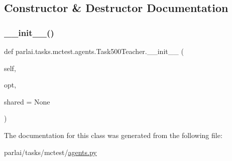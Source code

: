 \subsection{Constructor \& Destructor Documentation}
\mbox{\label{classparlai_1_1tasks_1_1mctest_1_1agents_1_1Task500Teacher_a122ab6b53f9bb97f84ae1a5e29a6deca}} 
\subsubsection{\texorpdfstring{\+\_\+\+\_\+init\+\_\+\+\_\+()}{\_\_init\_\_()}}
{\footnotesize\ttfamily def parlai.\+tasks.\+mctest.\+agents.\+Task500\+Teacher.\+\_\+\+\_\+init\+\_\+\+\_\+ (\begin{DoxyParamCaption}\item[{}]{self,  }\item[{}]{opt,  }\item[{}]{shared = {\ttfamily None} }\end{DoxyParamCaption})}



The documentation for this class was generated from the following file\+:\begin{DoxyCompactItemize}
\item 
parlai/tasks/mctest/\hyperlink{parlai_2tasks_2mctest_2agents_8py}{agents.\+py}\end{DoxyCompactItemize}
